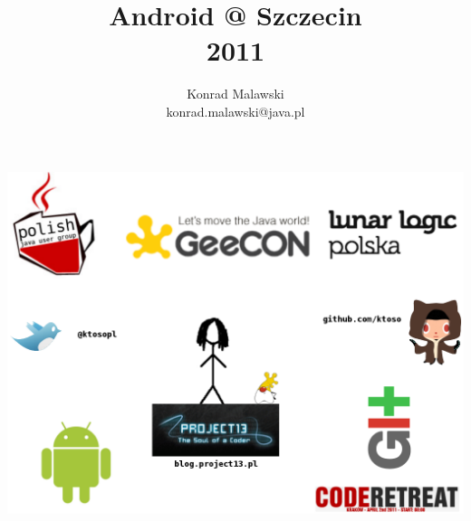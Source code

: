\documentclass{beamer}
\title{Android @ Szczecin \\ 2011}
\author{Konrad Malawski \\ konrad.malawski@java.pl}
\begin{document}
\begin{frame}
\titlepage
\end{frame}


\begin{frame}
  \centering
  \includegraphics[width=\textwidth,height=\textheight]{images/about_me_slide}
\end{frame}
\end{document}

